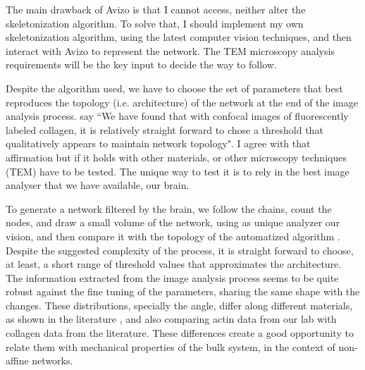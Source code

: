 The main drawback of Avizo is that I cannot access, neither alter the
skeletonization algorithm.
To solve that, I should implement my own skeletonization algorithm, using the
latest computer vision techniques\citep{bai_skeleton_2007}, and then interact with Avizo to represent the network.
The TEM microscopy analysis
requirements will be the key input to decide the way to follow.

Despite the algorithm used, we have to choose the set of parameters that best reproduces the topology (i.e.
architecture) of the network at the end of the image analysis process.
\citep{stein_algorithm_2008} say ``We have found that with confocal images of
fluorescently labeled collagen, it is relatively straight forward
to chose a threshold that qualitatively appears to maintain
network topology". I agree with that affirmation but if it holds with
other materials, or other microscopy techniques (TEM) have to be tested. The
unique way to test it is to rely in the best image analyser that we have available, our brain.

To generate a network filtered by the brain, we follow the chains, count
the nodes, and draw a small volume of the network, using as unique analyzer our vision, and then
compare it with the topology of the automatized algorithm
\citep{chandran_affine_2006}.
Despite the suggested complexity of the process,
it is straight forward to choose, at least, a short range of threshold values that approximates the architecture. The
 information extracted from the image analysis process seems to be quite robust
against the fine tuning of the parameters, sharing the same shape with the
changes.
These distributions, specially the angle, differ along
different materials, as shown in the literature
\citep{lindstrom_finite-strain_2013}, and also comparing actin data from our lab
with collagen data from the literature\citep{lindstrom_biopolymer_2010}. These
differences create a good opportunity to relate them with mechanical properties of the bulk
system, in the context of non-affine networks.





